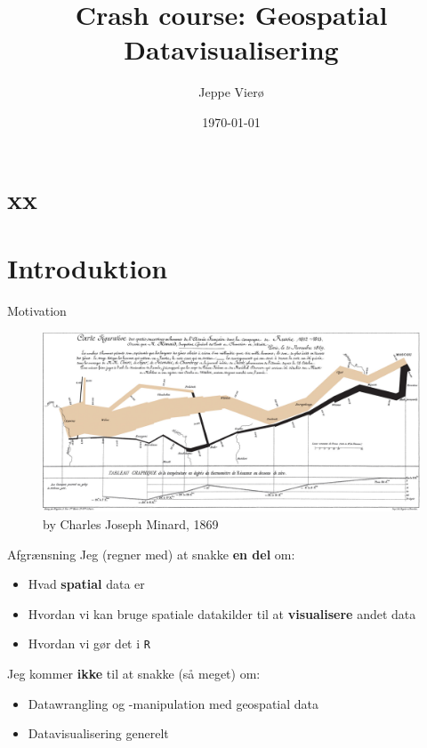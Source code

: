 \documentclass[
  8pt,
  ignorenonframetext,
  aspectratio=169]{beamer}
\title{Crash course: Geospatial Datavisualisering}
\author{Jeppe Vierø}
\date{\today}
\begin{document}
\frame{\titlepage}

\begin{frame}[allowframebreaks]
  \tableofcontents[hideallsubsections]
\end{frame}
\hypertarget{xx}{%
\section{xx}\label{xx}}

\hypertarget{introduktion}{%
\section{Introduktion}\label{introduktion}}

\begin{frame}{Motivation}
\protect\hypertarget{motivation}{}
\begin{figure}[H]
    \centering
    \includegraphics[width=.90\textwidth]{pictures/Minard.png}
    \caption{by Charles Joseph Minard, 1869}
\end{figure}
\end{frame}

\begin{frame}[fragile]{Afgrænsning}
\protect\hypertarget{afgruxe6nsning}{}
Jeg (regner med) at snakke \textbf{en del} om:

\begin{itemize}
\item
  Hvad \textbf{spatial} data er
\item
  Hvordan vi kan bruge spatiale datakilder til at \textbf{visualisere}
  andet data
\item
  Hvordan vi gør det i \texttt{R}
\end{itemize}

\bigskip

Jeg kommer \textbf{ikke} til at snakke (så meget) om:

\begin{itemize}
\item
  Datawrangling og -manipulation med geospatial data
\item
  Datavisualisering generelt
\end{itemize}
\end{frame}
\end{document}
